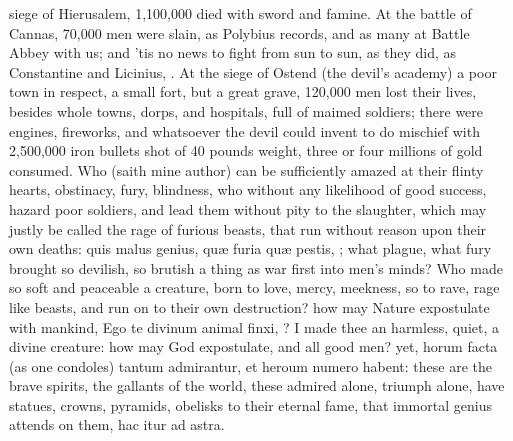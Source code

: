 {siege of Hierusalem, 1,100,000 died with sword and famine. At the
battle of Cannas, 70,000 men were slain, as Polybius records, and
as many at Battle Abbey with us; and 'tis no news to fight from sun to
sun, as they did, as Constantine and Licinius, \etc{}. At the siege of
Ostend (the devil's academy) a poor town in respect, a small fort, but
a great grave, 120,000 men lost their lives, besides whole towns,
dorps, and hospitals, full of maimed soldiers; there were engines,
fireworks, and whatsoever the devil could invent to do mischief with
2,500,000 iron bullets shot of 40 pounds weight, three or four millions
of gold consumed. Who (saith mine author) can be sufficiently
amazed at their flinty hearts, obstinacy, fury, blindness, who without
any likelihood of good success, hazard poor soldiers, and lead them
without pity to the slaughter, which may justly be called the rage of
furious beasts, that run without reason upon their own deaths:
quis malus genius, qu\ae{} furia qu\ae{} pestis, \etc{}; what plague, what
fury brought so devilish, so brutish a thing as war first into men's
minds? Who made so soft and peaceable a creature, born to love, mercy,
meekness, so to rave, rage like beasts, and run on to their own
destruction? how may Nature expostulate with mankind, Ego te divinum
animal finxi, \etc{}? I made thee an harmless, quiet, a divine creature:
how may God expostulate, and all good men? yet, horum facta (as
one condoles) tantum admirantur, et heroum numero habent: these
are the brave spirits, the gallants of the world, these admired alone,
triumph alone, have statues, crowns, pyramids, obelisks to their
eternal fame, that immortal genius attends on them, hac itur ad astra.

}
